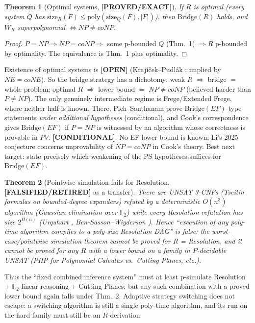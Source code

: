\documentclass[11pt]{article}
\newtheorem{theorem}{Theorem}
\theoremstyle{definition}
\newcommand{\WR}{\overline W_R}
\newcommand{\st}[1]{\textbf{[#1]}}
\begin{document}
\begin{theorem}[Optimal systems, \st{PROVED/EXACT}]
If $R$ is optimal (every system $Q$ has $\mathrm{size}_R(F)\le\mathrm{poly}(\mathrm{size}_Q(F),|F|)$),
then $\mathrm{Bridge}(R)$ holds, and $\WR$ superpolynomial $\iff NP\ne coNP$.
\end{theorem}
\begin{proof}
$P=NP\Rightarrow NP=coNP\Rightarrow$ some p-bounded $Q$ (Thm.~1) $\Rightarrow R$ p-bounded by
optimality. The equivalence is Thm.~1 plus optimality.
\end{proof}
\noindent Existence of optimal systems is \st{OPEN} (Krajíček--Pudlák \cite{kp}: implied by
$NE=coNE$). So the bridge strategy has a dichotomy: weak $R$ $\Rightarrow$ bridge $=$ whole
problem; optimal $R$ $\Rightarrow$ lower bound $=$ $NP\ne coNP$ (believed harder than $P\ne NP$).
The only genuinely intermediate regime is Frege/Extended Frege, where neither half is known.
There, Pich--Santhanam \cite{ps} prove $\mathrm{Bridge}(EF)$-type statements \emph{under
additional hypotheses} (conditional), and Cook's correspondence \cite{cook75} gives
$\mathrm{Bridge}(EF)$ if $P=NP$ is witnessed by an algorithm whose correctness is provable
in $PV$. \st{CONDITIONAL}. No EF lower bound is known; Li's 2025 conjecture \cite{li}
concerns unprovability of $NP=coNP$ in Cook's theory. Best next target: state precisely
which weakening of the PS hypotheses suffices for $\mathrm{Bridge}(EF)$.

\begin{theorem}[Pointwise simulation fails for Resolution, \st{FALSIFIED/RETIRED} as a transfer]
There are UNSAT 3-CNFs (Tseitin formulas on bounded-degree expanders) refuted by a
deterministic $O(n^3)$ algorithm (Gaussian elimination over $\mathbb F_2$) while every
Resolution refutation has size $2^{\Omega(n)}$ (Urquhart \cite{urq}, Ben-Sasson--Wigderson
\cite{bsw}). Hence ``execution of any poly-time algorithm compiles to a poly-size
Resolution DAG'' is false; the worst-case/pointwise simulation theorem cannot be proved for
$R$ = Resolution, and it cannot be proved for any $R$ with a lower bound on a family in
$P$-decidable UNSAT (PHP for Polynomial Calculus vs.\ Cutting Planes, etc.).
\end{theorem}
\noindent Thus the ``fixed combined inference system'' must at least p-simulate
Resolution + $\mathbb F_2$-linear reasoning + Cutting Planes; but any such combination
with a proved lower bound again falls under Thm.~2. Adaptive strategy switching does not
escape: a switching algorithm is still a single poly-time algorithm, and its run on the
hard family must still be an $R$-derivation.
\end{document}
